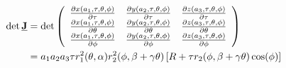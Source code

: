\begin{align}\label{eq:detJ_supershapes}
\det{\M{J}} &= \det
  \left(
    \begin{array}{ccc}
         \frac{\partial x(a_1,\tau,\theta,\phi)}{\partial \tau}
       & \frac{\partial y(a_2,\tau,\theta,\phi)}{\partial \tau}
       & \frac{\partial z(a_3,\tau,\theta,\phi)}{\partial \tau}\\
         \frac{\partial x(a_1,\tau,\theta,\phi)}{\partial \theta}
       & \frac{\partial y(a_2,\tau,\theta,\phi)}{\partial \theta}
       & \frac{\partial z(a_3,\tau,\theta,\phi)}{\partial \theta} \\
         \frac{\partial x(a_1,\tau,\theta,\phi)}{\partial \phi}
       & \frac{\partial y(a_2,\tau,\theta,\phi)}{\partial \phi}
       & \frac{\partial z(a_3,\tau,\theta,\phi)}{\partial \phi}
    \end{array}
  \right)  \nonumber \\
  &= a_1a_2a_3
   \tau r_1^2(\theta,\alpha) r_2^2(\phi,\beta+\gamma\theta) \left[R+\tau r_2(\phi,\beta+\gamma\theta)\cos(\phi )\right]
\end{align}
